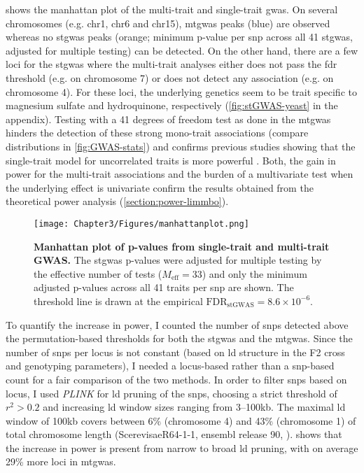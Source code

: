  shows the manhattan plot of the multi-trait and single-trait \gls{gwas}. On several chromosomes (e.g. chr1, chr6 and chr15), \gls{mtgwas} peaks (blue) are observed whereas no \gls{stgwas} peaks (orange; minimum p-value per \gls{snp} across all \num{41} \gls{stgwas}, adjusted for multiple testing) can be detected. On the other hand, there are a few  loci for the \gls{stgwas} where the multi-trait analyses either does not pass the \gls{fdr} threshold (e.g. on chromosome \num{7}) or does not detect any association (e.g. on chromosome \num{4}). For these loci, the underlying genetics seem to be trait specific to magnesium sulfate and hydroquinone, respectively (\cref{fig:stGWAS-yeast} in the appendix). Testing with a \num{41} degrees of freedom test as done in the \gls{mtgwas} hinders the detection of these strong mono-trait associations (compare distributions in \cref{fig:GWAS-stats}) and confirms previous studies showing that the single-trait model for uncorrelated traits is more powerful \citep{Korte2012}. Both, the gain in power for the multi-trait associations and the burden of a multivariate test when the underlying effect is univariate confirm the results obtained from the theoretical power analysis (\cref{section:power-limmbo}). 

\begin{figure}[hbtp]
	\centering
	\texttt{[image: Chapter3/Figures/manhattanplot.png]}
	\caption[\textbf{Manhattan plot of p-values from single-trait and multi-trait GWAS.}]{\textbf{Manhattan plot of p-values from single-trait and multi-trait GWAS.} The \gls{stgwas} p-values were adjusted for multiple testing by the effective number of tests (\(M_\text{eff} = 33\)) and only the minimum adjusted p-values across all \num{41} traits per \gls{snp} are shown. The threshold line is drawn at the empirical \(\text{FDR}_{\text{stGWAS}} =8.6 \times 10^{-6}\).}
 	\label{fig:GWAS-yeast}
\end{figure}

To quantify the increase in power, I counted the number of \glspl{snp} detected above the permutation-based thresholds for both the \gls{stgwas} and the \gls{mtgwas}. Since the number of \glspl{snp} per locus is not constant (based on \gls{ld} structure in the F2 cross and genotyping parameters), I needed a locus-based rather than a \gls{snp}-based count for a fair comparison of the two methods. In order to filter \glspl{snp} based on locus, I used \textit{PLINK} for \gls{ld} pruning of the \glspl{snp}, choosing a strict threshold of \(r^2 > 0.2\) and increasing \gls{ld} window sizes ranging from \numrange{3}{100}kb.  The maximal \gls{ld} window of \num{100}kb covers between \num{6}\% (chromosome \num{4}) and \num{43}\% (chromosome 1) of total chromosome length (ScerevisaeR64-1-1, ensembl release 90, \citep{Aken2016}).  shows that the increase in power is present from narrow to broad \gls{ld} pruning, with on average \num{29}\% more loci in \gls{mtgwas}.

